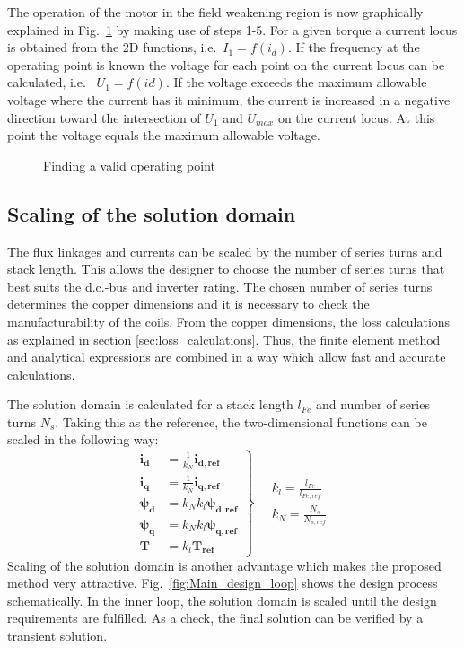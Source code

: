 The operation of the motor in the field weakening region is now graphically explained in Fig.~\ref{fig:f_locus} by making use of steps 1-5. For a given torque a current locus is obtained from the 2D functions, i.e.~$I_1 = f(i_d)$. If the frequency at the operating point is known the voltage for each point on the current locus can be calculated, i.e.~%
$U_1 = f(id)$. If the voltage exceeds the maximum allowable voltage where the current has it minimum, the current is increased in a negative direction toward the intersection of $U_1$ and $U_{max}$ on the current locus. At this point the voltage equals the maximum allowable voltage.
\begin{figure}
  \centering
    
  \caption{Finding a valid operating point}
  \label{fig:f_locus}
\end{figure}

\subsection{Scaling of the solution domain}
The flux linkages and currents can be scaled by the number of series turns and stack length. This allows the designer to choose the number of series turns that best suits the d.c.-bus and inverter rating. The chosen number of series turns determines the copper dimensions and it is necessary to check the manufacturability of the coils. From the copper dimensions, the loss calculations as explained in section \ref{sec:loss_calculations}. Thus, the finite element method and analytical expressions are combined in a way which allow fast and accurate calculations. 

The solution domain is calculated for a stack length $l_{Fe}$ and number of series turns $N_s$. Taking this as the reference, the two-dimensional functions can be scaled in the following way:
\begin{equation}
  \label{eqn:2D_func}
  \left.
   \begin{aligned}
     \mathbf{i_d}    &= \frac{1}{k_N}\mathbf{i_{d,ref}} \\
     \mathbf{i_q}    &= \frac{1}{k_N}\mathbf{i_{q,ref}} \\
     \mathbf{\psi_d} &= k_N k_l\mathbf{\psi_{d,ref}}    \\
     \mathbf{\psi_q} &= k_N k_l\mathbf{\psi_{q,ref}}    \\
     \mathbf{T}      &= k_l\mathbf{T_{ref}}
   \end{aligned}
   \right\}  
   \quad
   \begin{aligned}
    k_l = \frac{l_{Fe}}{l_{Fe,ref}} \\
    k_N = \frac{N_s}{N_{s,ref}} 
  \end{aligned}
\end{equation}
Scaling of the solution domain is another advantage which makes the proposed method very attractive. Fig.~\ref{fig:Main_design_loop} shows the design process schematically. In the inner loop, the solution domain is scaled until the design requirements are fulfilled. As a check, the final solution can be verified by a transient solution.  

